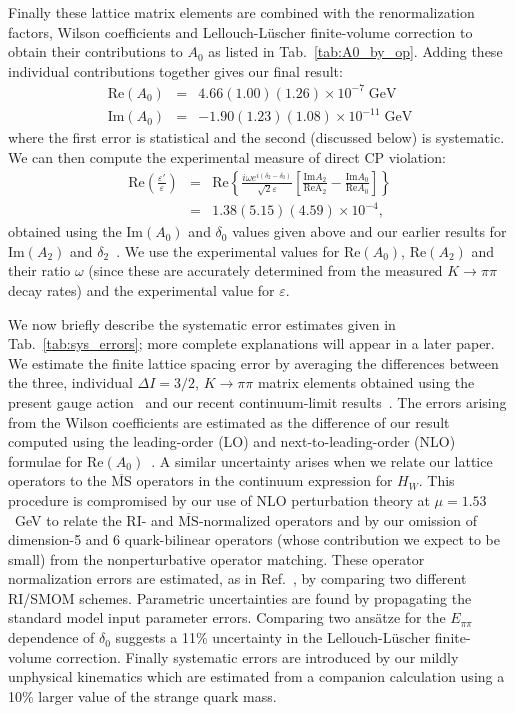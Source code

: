 \documentclass[aps,prl,
superscriptaddress,
showpacs,
preprintnumbers,
bibnotes,
amsmath,
amssymb,
twocolumn,
floatfix,
]{revtex4-1}
\begin{document}
Finally these lattice matrix elements are combined with the renormalization factors, Wilson coefficients and Lellouch-L\"uscher finite-volume correction to obtain their contributions to $A_0$ as listed in  Tab.~\ref{tab:A0_by_op}.   Adding these individual contributions together gives our final result:
\begin{eqnarray}
\mathrm{Re}(A_0) &=&  4.66(1.00)(1.26) \times 10^{-7}\;\mathrm{GeV}
\label{eq:real_A0} \\
\mathrm{Im}(A_0)  &=& -1.90(1.23)(1.08) \times 10^{-11}\;\mathrm{GeV}
\label{eq:imag_A0}
\end{eqnarray}
where the first error is statistical and the second (discussed below) is systematic.  We can then compute the experimental measure of direct CP violation:
\begin{eqnarray}
\mathrm{Re}\left(\frac{\varepsilon'}{\varepsilon}\right) &=& \mathrm{Re}\left\{ \frac{i\omega e^{i(\delta_2-\delta_0)}}{\sqrt{2}\varepsilon}\left[ \frac{\mathrm{Im}A_2}{\mathrm{ReA}_2}-\frac{\mathrm{Im}A_0}{\mathrm{Re}A_0} \right] \right\}
\label{eq:ep-e_theory} \\
&=&1.38(5.15)(4.59)\times10^{-4},
\label{eq:ep-e}
\end{eqnarray}
obtained using the Im$(A_0)$  and $\delta_0$ values given above and our earlier results for Im$(A_2)$ and $\delta_2$~\cite{Blum:2015ywa}.  We use the experimental values for Re$(A_0)$, Re$(A_2)$ and their ratio $\omega$ (since these are accurately determined from the measured $K\to\pi\pi$ decay rates) and the experimental value for $\varepsilon$.

We now briefly describe the systematic error estimates given in Tab.~\ref{tab:sys_errors}; more complete explanations will appear in a later paper.  We estimate the finite lattice spacing error by averaging the differences between the three, individual $\Delta I = 3/2$, $K\to\pi\pi$  matrix elements obtained using the present gauge action~\cite{Blum:2012uk} and our recent continuum-limit results~\cite{Blum:2015ywa}.  The errors arising from the Wilson coefficients are estimated as the difference of our result computed using the leading-order (LO) and next-to-leading-order (NLO) formulae for Re$(A_0)$~\cite{Buchalla:1995vs}.   A similar uncertainty arises when we relate our lattice operators to the $\overline{\mathrm{MS}}$ operators in the continuum expression for $H_W$.  This procedure is compromised by our use of NLO perturbation theory at $\mu=1.53$~GeV to relate the RI- and $\overline{\mathrm{MS}}$-normalized operators and by our omission of dimension-5 and 6 quark-bilinear operators (whose contribution we expect to be small) from the nonperturbative operator matching.  These operator normalization errors are estimated, as in Ref.~\cite{Blum:2015ywa}, by comparing two different RI/SMOM schemes.  Parametric uncertainties are found by propagating the standard model input parameter errors.  Comparing two ans\"atze for the $E_{\pi\pi}$ dependence of $\delta_0$ suggests a 11\% uncertainty in the Lellouch-L\"uscher finite-volume correction.  Finally systematic errors are introduced by our mildly unphysical kinematics which are estimated from a companion calculation using a 10\% larger value of the strange quark mass.
\end{document}
